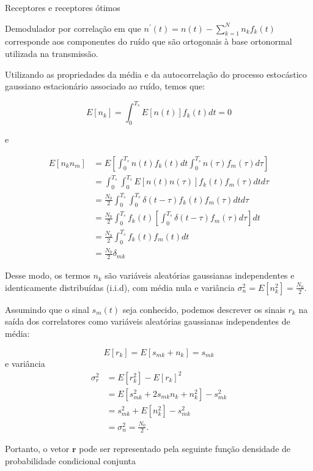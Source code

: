\documentclass[
  ignorenonframetext,
]{beamer}
\begin{document}
\begin{frame}{Receptores e receptores ótimos}
\begin{block}{Demodulador por correlação}
em que \(n^{\prime}(t)=n(t)-\sum_{k=1}^N n_k f_k(t)\) corresponde aos
componentes do ruído que são ortogonais à base ortonormal utilizada na
transmissão.

Utilizando as propriedades da média e da autocorrelação do processo
estocástico gaussiano estacionário associado ao ruído, temos que:

\begin{equation}
E\left[n_k\right]=\int_0^{T_s} E[n(t)] f_k(t) dt=0
\end{equation}

e

\[
\begin{align}
E\left[n_k n_m\right] & = E\left[ \int_0^{T_s} n(t) f_k(t) dt \int_0^{T_s} n(\tau) f_m(\tau) d\tau\right] \nonumber \\
& = \int_0^{T_s} \int_0^{T_s} E[n(t) n(\tau)] f_k(t) f_m(\tau) d t d \tau \nonumber \\
& =\frac{N_0}{2}  \int_0^{T_s} \int_0^{T_s} \delta(t-\tau) f_k(t) f_m(\tau) d t d \tau \nonumber \\
& = \frac{N_0}{2} \int_0^{T_s} f_k(t) \left[\int_0^{T_s} \delta(t-\tau)  f_m(\tau) d \tau \right] d t \nonumber \\
& =\frac{N_0}{2} \int_0^{T_s} f_k(t) f_m(t) d t \nonumber \\
& =\frac{N_0}{2} \delta_{m k}
\end{align}
\]

Desse modo, os termos \(n_k\) são variáveis aleatórias gaussianas
independentes e identicamente distribuídas (i.i.d), com média nula e
variância \(\sigma_n^2 = E[n_k^2] = \frac{N_0}{2}\).

Assumindo que o sinal \(s_m(t)\) seja conhecido, podemos descrever os
sinais \(r_k\) na saída dos correlatores como variáveis aleatórias
gaussianas independentes de média:

\begin{equation}
E\left[r_k\right]=E\left[s_{m k}+n_k\right]=s_{m k} 
\end{equation} e variância \[
\begin{align}
\sigma_r^2 &= E\left[r_k^2\right] - E[r_k]^2 \nonumber \\
&= E\left[s_{mk}^2 + 2s_{mk}n_k + n_k^2\right] - s_{mk}^2\nonumber \\
&= s_{mk}^2 + E[n_k^2] - s_{mk}^2\nonumber \\
&= \sigma_n^2=\frac{N_0}{2}.
\end{align}
\]

Portanto, o vetor \(\mathbf{r}\) pode ser representado pela seguinte
função densidade de probabilidade condicional conjunta


\end{block}
\end{frame}
\end{document}
